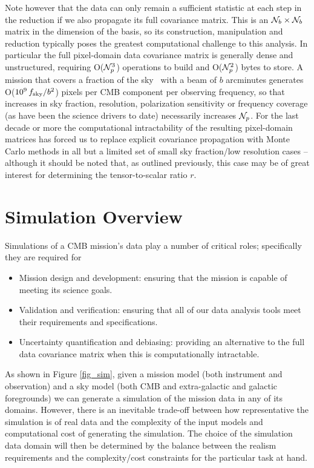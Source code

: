 Note however that the data can only remain a sufficient statistic at each step in the reduction if we also propagate its full covariance matrix. This is an ${\cal N}_b \times {\cal N}_b$ matrix in the dimension of the basis, so its construction, manipulation and reduction typically poses the greatest computational challenge to this analysis. In particular the full pixel-domain data covariance matrix is generally dense and unstructured, requiring O(${\cal N}_p^3$) operations to build and O(${\cal N}_p^2$) bytes to store. A mission that covers a fraction of the sky \fsky\ with a beam of $b$ arcminutes generates O($10^9 \, f_\mathrm{sky}/b^2$) pixels per CMB component per observing frequency, so that increases in sky fraction, resolution, polarization sensitivity or frequency coverage (as have been the science drivers to date) necessarily increases ${\cal N}_p$. For the last decade or more the computational intractability of the resulting pixel-domain matrices has forced us to replace explicit covariance propagation with Monte Carlo methods in all but a limited set of small sky fraction/low resolution cases -- although it should be noted that, as outlined previously, this case may be of great interest for determining the tensor-to-scalar ratio $r$.







\section{Simulation Overview}
Simulations of a CMB mission's data play a number of critical roles; specifically they are required for
\begin{itemize}
\item Mission design and development: ensuring that the mission is capable of meeting its science goals.
\item Validation and verification: ensuring that all of our data analysis tools meet their requirements and specifications.
\item Uncertainty quantification and debiasing: providing an alternative to the full data covariance matrix when this is computationally intractable.
\end{itemize}

As shown in Figure \ref{fig_sim}, given a mission model (both instrument and observation) and a sky model (both CMB and extra-galactic and galactic foregrounds) we can generate a simulation of the mission data in any of its domains. However, there is an inevitable trade-off between how representative the simulation is of real data and the complexity of the input models and computational cost of generating the simulation. The choice of the simulation data domain will then be determined by the balance between the realism requirements and the complexity/cost constraints for the particular task at hand.

